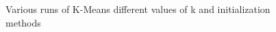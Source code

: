 \documentclass[a4paper, 11pt]{article}
\begin{document}
\begin{figure}
{}
\caption[]{Various runs of K-Means different values of k and initialization methods}
\label{fig:kmeans1}
\end{figure}
\end{document}
